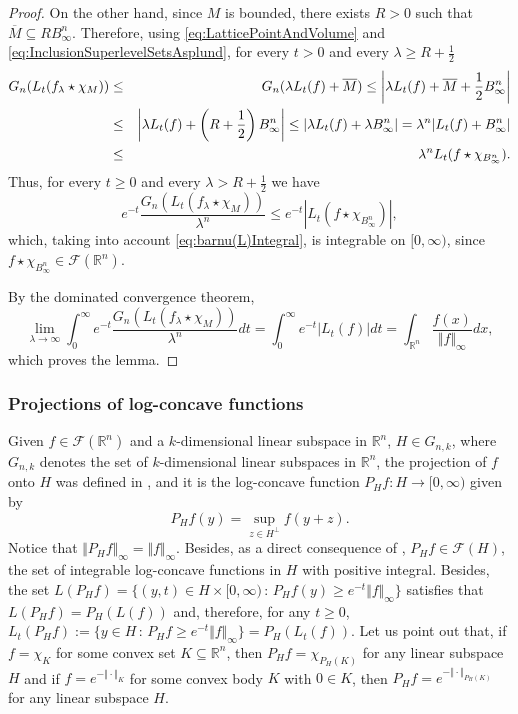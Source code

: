 \documentclass{amsart}
\newcommand{\R}{\mathbb R}
\theoremstyle{remark}
\theoremstyle{definition}
\numberwithin{equation}{section}
\begin{document}
\begin{proof}
On the other hand, since $M$ is bounded, there exists $R>0$ such that $\overline{M}\subseteq RB_\infty^n$. Therefore,  using \eqref{eq:LatticePointAndVolume} and \eqref{eq:InclusionSuperlevelSetsAsplund}, for every $t>0$ and every $\lambda\geq R+\frac{1}{2}$
\begin{eqnarray*}
G_n(L_t(f_\lambda\star\chi_M))&\leq& G_n(\lambda L_t(f)+\overline{M})\leq\left|\lambda L_t(f)+\overline{M}+\frac{1}{2}B_\infty^n\right|\cr
&\leq&\left|\lambda L_t(f)+\left(R+\frac{1}{2}\right)B_\infty^n\right|\leq\left|\lambda L_t(f)+\lambda B_\infty^n\right|=\lambda^n|L_t(f)+B_\infty^n|\cr
&\leq&\lambda^n L_t(f\star\chi_{B_\infty^n}).
\end{eqnarray*}
 Thus, for every $t\geq0$ and every $\lambda>R+\frac{1}{2}$ we have
$$
e^{-t} \frac{G_n(L_t(f_\lambda\star\chi_M))}{\lambda^n}\leq e^{-t}\left|L_t (f\star \chi_{B_\infty^n})\right|,
$$
which, taking into account \eqref{eq:barnu(L)Integral}, is integrable on $[0,\infty)$, since $f\star \chi_{B_\infty^n}\in\mathcal{F}(\R^n)$.

By the dominated convergence theorem,
$$
\lim_{\lambda\to\infty}\int_0^\infty e^{-t} \frac{G_n(L_t(f_\lambda\star\chi_M))}{\lambda^n}dt=\int_0^\infty e^{-t} |L_t (f)|dt=\int_{\R^n}\frac{f(x)}{\Vert f\Vert_\infty}dx,
$$
which proves the lemma.
\end{proof}

\subsubsection{Projections of log-concave functions}\label{sec:ProjectionsOfFunctions}

Given $f\in\mathcal{F}(\R^n)$ and a $k$-dimensional linear subspace in $\R^n$, $H\in G_{n,k}$, where $G_{n,k}$ denotes the set of $k$-dimensional linear subspaces in $\R^n$, the projection of $f$ onto $H$ was defined in \cite{KM}, and it is the log-concave function $P_Hf:H\to[0,\infty)$ given by
$$
P_Hf(y)=\sup_{z\in H^\perp}f(y+z).
$$
Notice  that $\Vert P_Hf\Vert_\infty=\Vert f\Vert_\infty$. Besides, as a direct consequence of \cite[Lem. 2.1.1]{BGVV}, $P_Hf\in\mathcal{F}(H)$, the set of integrable log-concave functions in $H$ with positive integral. Besides, the set $L(P_Hf)=\{(y,t)\in H\times[0,\infty)\,:\,P_Hf(y)\geq e^{-t}\Vert f\Vert_\infty \}$ satisfies that $L(P_Hf)=P_H(L(f))$ and, therefore, for any $t\geq0$, $L_t(P_Hf):=\{y\in H\,:\,P_H f\geq e^{-t}\Vert f\Vert_\infty\}=P_H(L_t(f))$. Let us point out that, if $f=\chi_K$ for some convex set $K\subseteq\R^n$, then $P_Hf=\chi_{P_H(K)}$ for any linear subspace $H$ and if $f=e^{-\Vert \cdot\Vert_K}$ for some convex body $K$ with $0\in K$, then $P_Hf=e^{-\Vert \cdot\Vert_{P_H(K)}}$ for any linear subspace $H$.
\end{document}

